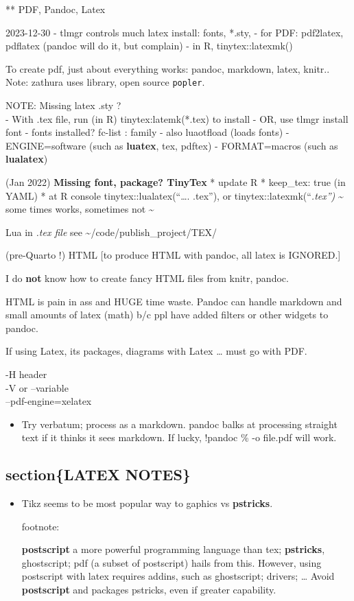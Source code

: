 \documentclass[
]{report}
\providecommand{\tightlist}{%
  \setlength{\itemsep}{0pt}\setlength{\parskip}{0pt}}\usepackage{longtable,booktabs,array}
\begin{document}
** PDF, Pandoc, Latex

2023-12-30 - tlmgr controls much latex install: fonts, *.sty, - for PDF:
pdf2latex, pdflatex (pandoc will do it, but complain) - in R,
tinytex::latexmk()

To create pdf, just about everything works: pandoc, markdown, latex,
knitr.. Note: zathura uses library, open source \texttt{popler}.

NOTE: Missing latex .sty ?\\
- With .tex file, run (in R) tinytex:latemk(*.tex) to install - OR, use
tlmgr install font - fonts installed? fc-list : family - also luaotfload
(loads fonts) - ENGINE=software (such as \textbf{luatex}, tex, pdftex) -
FORMAT=macros (such as \textbf{lualatex})

(Jan 2022) \textbf{Missing font, package? TinyTex} * update R *
keep\_tex: true (in YAML) * at R console tinytex::lualatex(``\ldots.
.tex''), or tinytex::latexmk(``\emph{.tex'') } \textasciitilde{} some
times works, sometimes not \textasciitilde{}

Lua in \emph{.tex file } see \textasciitilde/code/publish\_project/TEX/

(pre-Quarto !) HTML {[}to produce HTML with pandoc, all latex is
IGNORED.{]}

I do \textbf{not} know how to create fancy HTML files from knitr,
pandoc.

HTML is pain in ass and HUGE time waste. Pandoc can handle markdown and
small amounts of latex (math) b/c ppl have added filters or other
widgets to pandoc.

If using Latex, its packages, diagrams with Latex \ldots{} must go with
PDF.

-H header\\
-V or --variable\\
--pdf-engine=xelatex

\begin{itemize}
\tightlist
\item
  Try verbatum; process as a markdown. pandoc balks at processing
  straight text if it thinks it sees markdown. If lucky, !pandoc \% -o
  file.pdf will work.
\end{itemize}

\subsection{section\{LATEX NOTES\}}\label{sectionlatex-notes}

\begin{itemize}
\item
  Tikz seems to be most popular way to gaphics vs \textbf{pstricks}.

  footnote:

  \par

  \textbf{postscript} a more powerful programming language than tex;
  \textbf{pstricks}, ghostscript; pdf (a subset of postscript) hails
  from this. However, using postscript with latex requires addins, such
  as ghostscript; drivers; \ldots{} Avoid \textbf{postscript} and
  packages pstricks, even if greater capability.
\end{itemize}
\end{document}
